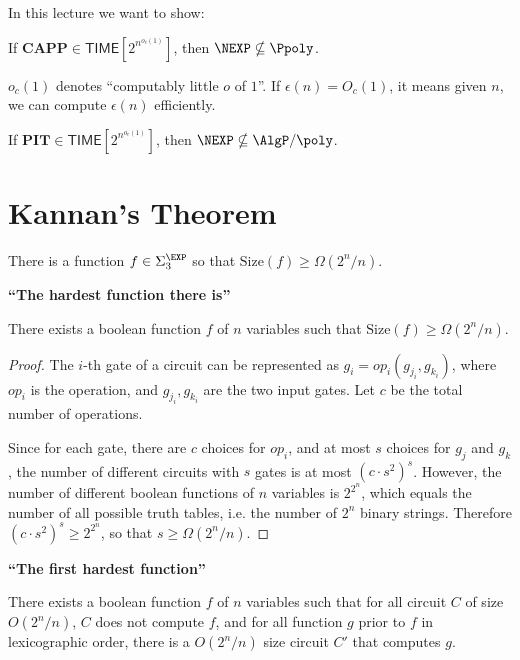 \documentclass[letterpaper, 12pt]{article}
\newcommand{\CAPP}{\mathbf{CAPP}}
\newcommand{\PIT}{\mathbf{PIT}}
\newcommand{\Time}[1]{\mathsf{TIME}[#1]}
\newcommand{\Size}[1]{\mathrm{Size}(#1)}
\begin{document}
In this lecture we want to show:

\begin{theorem} [IKW]\label{IKW}
	If $\CAPP \in \Time{2^{n^{o_c(1)}}}$, then $\NEXP \nsubseteq \Ppoly$.
\end{theorem}

$o_c(1)$ denotes ``computably little $o$ of $1$''. If $\epsilon(n) = O_c(1)$, it means given $n$, we can compute $\epsilon(n)$ efficiently.

\begin{theorem} [KI]
	If $\PIT \in \Time{2^{n^{o_c(1)}}}$, then $\NEXP \nsubseteq \AlgP / \poly$.
\end{theorem}


\section{Kannan's Theorem}
\begin{theorem}[Kannan]
	There is a function $f \in \Sigma_3^\EXP$ so that $\Size{f} \geq \Omega(2^n / n)$.
\end{theorem}

\noindent \textbf{``The hardest function there is''}

\begin{lemma}
There exists a boolean function $f$ of $n$ variables such that $\Size{f} \geq \Omega(2^n / n)$.
\end{lemma}

\begin{proof}
	The $i$-th gate of a circuit can be represented as
	$g_i = op_i (g_{j_i}, g_{k_i})$, where $op_i$ is the operation, and $g_{j_i}, g_{k_i}$ are the two input gates.
	Let $c$ be the total number of operations.
	
	Since for each gate, there are $c$ choices for $op_i$, and at most $s$ choices for $g_j$ and $g_k$,
	the number of different circuits with $s$ gates is at most $(c \cdot s^2)^s$.
	However, the number of different boolean functions of $n$ variables is $2^{2^n}$, which equals the number of all possible truth tables, i.e. the number of $2^n$ binary strings.
	Therefore $(c \cdot s^2)^s \geq 2^{2^n}$, so that $s \geq \Omega(2^n / n)$.
\end{proof}

\noindent \textbf{``The first hardest function''}

\begin{lemma}
There exists a boolean function $f$ of $n$ variables such that for all circuit $C$ of size $O(2^n / n)$, $C$ does not compute $f$, and for all function $g$ prior to $f$ in lexicographic order, there is a $O(2^n / n)$ size circuit $C'$ that computes $g$.
\end{lemma}
\end{document}
